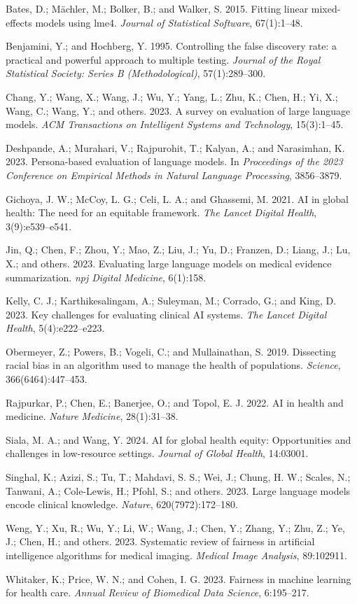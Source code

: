 \documentclass[sigconf]{acmart}
\begin{document}
Bates, D.; M{\"a}chler, M.; Bolker, B.; and Walker, S. 2015.
Fitting linear mixed-effects models using lme4.
\textit{Journal of Statistical Software}, 67(1):1--48.

Benjamini, Y.; and Hochberg, Y. 1995.
Controlling the false discovery rate: a practical and powerful approach to multiple testing.
\textit{Journal of the Royal Statistical Society: Series B (Methodological)}, 57(1):289--300.

Chang, Y.; Wang, X.; Wang, J.; Wu, Y.; Yang, L.; Zhu, K.; Chen, H.; Yi, X.; Wang, C.; Wang, Y.; and others. 2023.
A survey on evaluation of large language models.
\textit{ACM Transactions on Intelligent Systems and Technology}, 15(3):1--45.

Deshpande, A.; Murahari, V.; Rajpurohit, T.; Kalyan, A.; and Narasimhan, K. 2023.
Persona-based evaluation of language models.
In \textit{Proceedings of the 2023 Conference on Empirical Methods in Natural Language Processing}, 3856--3879.

Gichoya, J. W.; McCoy, L. G.; Celi, L. A.; and Ghassemi, M. 2021.
AI in global health: The need for an equitable framework.
\textit{The Lancet Digital Health}, 3(9):e539--e541.

Jin, Q.; Chen, F.; Zhou, Y.; Mao, Z.; Liu, J.; Yu, D.; Franzen, D.; Liang, J.; Lu, X.; and others. 2023.
Evaluating large language models on medical evidence summarization.
\textit{npj Digital Medicine}, 6(1):158.

Kelly, C. J.; Karthikesalingam, A.; Suleyman, M.; Corrado, G.; and King, D. 2023.
Key challenges for evaluating clinical AI systems.
\textit{The Lancet Digital Health}, 5(4):e222--e223.


Obermeyer, Z.; Powers, B.; Vogeli, C.; and Mullainathan, S. 2019.
Dissecting racial bias in an algorithm used to manage the health of populations.
\textit{Science}, 366(6464):447--453.

Rajpurkar, P.; Chen, E.; Banerjee, O.; and Topol, E. J. 2022.
AI in health and medicine.
\textit{Nature Medicine}, 28(1):31--38.

Siala, M. A.; and Wang, Y. 2024.
AI for global health equity: Opportunities and challenges in low-resource settings.
\textit{Journal of Global Health}, 14:03001.

Singhal, K.; Azizi, S.; Tu, T.; Mahdavi, S. S.; Wei, J.; Chung, H. W.; Scales, N.; Tanwani, A.; Cole-Lewis, H.; Pfohl, S.; and others. 2023.
Large language models encode clinical knowledge.
\textit{Nature}, 620(7972):172--180.

Weng, Y.; Xu, R.; Wu, Y.; Li, W.; Wang, J.; Chen, Y.; Zhang, Y.; Zhu, Z.; Ye, J.; Chen, H.; and others. 2023.
Systematic review of fairness in artificial intelligence algorithms for medical imaging.
\textit{Medical Image Analysis}, 89:102911.

Whitaker, K.; Price, W. N.; and Cohen, I. G. 2023.
Fairness in machine learning for health care.
\textit{Annual Review of Biomedical Data Science}, 6:195--217.
\end{document}
